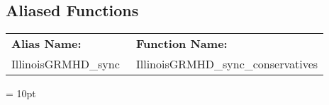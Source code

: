 \documentclass{article}
\begin{document}
\subsection*{Aliased Functions}

\hspace{5mm}

 \begin{tabular*}{160mm}{ll} 

{\bf Alias Name:} ~~~~~~~ & {\bf Function Name:} \\ 
IllinoisGRMHD\_sync & IllinoisGRMHD\_sync\_conservatives \\ 
\end{tabular*} 



\vspace{5mm}\parskip = 10pt 
\end{document}
